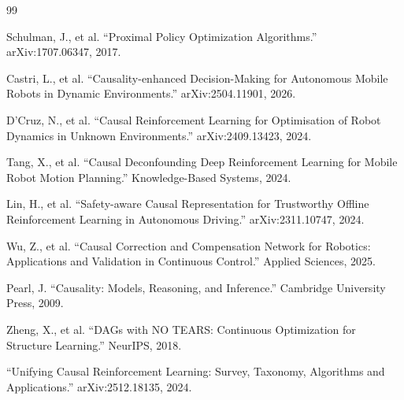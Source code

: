 \documentclass[11pt,a4paper]{article}
\begin{document}
\newpage

\begin{thebibliography}{99}

 Schulman, J., et al. ``Proximal Policy Optimization Algorithms.'' arXiv:1707.06347, 2017.

 Castri, L., et al. ``Causality-enhanced Decision-Making for Autonomous Mobile Robots in Dynamic Environments.'' arXiv:2504.11901, 2026.

 D'Cruz, N., et al. ``Causal Reinforcement Learning for Optimisation of Robot Dynamics in Unknown Environments.'' arXiv:2409.13423, 2024.

 Tang, X., et al. ``Causal Deconfounding Deep Reinforcement Learning for Mobile Robot Motion Planning.'' Knowledge-Based Systems, 2024.

 Lin, H., et al. ``Safety-aware Causal Representation for Trustworthy Offline Reinforcement Learning in Autonomous Driving.'' arXiv:2311.10747, 2024.

 Wu, Z., et al. ``Causal Correction and Compensation Network for Robotics: Applications and Validation in Continuous Control.'' Applied Sciences, 2025.

 Pearl, J. ``Causality: Models, Reasoning, and Inference.'' Cambridge University Press, 2009.

 Zheng, X., et al. ``DAGs with NO TEARS: Continuous Optimization for Structure Learning.'' NeurIPS, 2018.

 ``Unifying Causal Reinforcement Learning: Survey, Taxonomy, Algorithms and Applications.'' arXiv:2512.18135, 2024.

\end{thebibliography}
\end{document}
